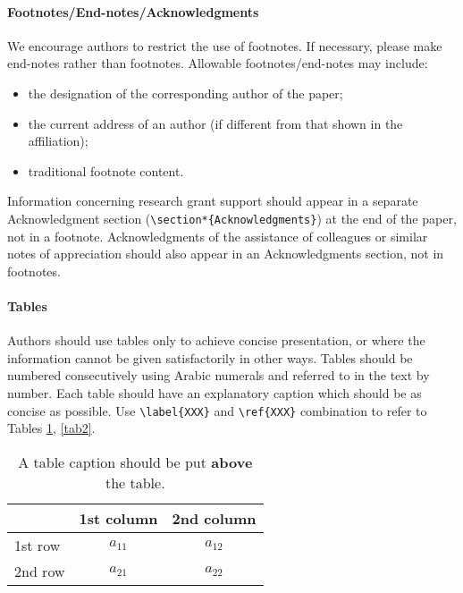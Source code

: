 \documentclass{lpaper} %
\begin{document}
\paragraph{Footnotes/End-notes/Acknowledgments}
We encourage authors to restrict the use of footnotes. If necessary, please make end-notes rather than footnotes. Allowable footnotes/end-notes may include:

\begin{itemize}
\item the designation of the corresponding author of the paper;
\item the current address of an author (if different from that shown in the affiliation);
\item traditional footnote content.
\end{itemize}


    Information concerning research grant support should appear in a separate Acknowledgment section ({\tt \verb+\section*{Acknowledgments}+}) at the end of the paper, not in a footnote. Acknowledgments of the assistance of colleagues or similar notes of appreciation should also appear in an Acknowledgments section, not in footnotes.

\paragraph{Tables}
    Authors should use tables only to achieve concise presentation, or where the information cannot be given satisfactorily in other ways. Tables should be numbered consecutively using Arabic numerals and referred to in the text by number. Each table should have an explanatory caption which should be as concise as possible. Use {\tt \verb+\label{XXX}+} and {\tt \verb+\ref{XXX}+} combination to refer to Tables \ref{tab1}, \ref{tab2}.

\begin{table}
\caption{A table caption should be put {\bfseries above} the table.\label{tab1}}
\begin{tabular}{lcc}
\hline
      & 1st column & 2nd column \\
\hline \hline
1st row & $a_{11}$ & $a_{12}$ \\
2nd row & $a_{21}$ & $a_{22}$ \\
\hline
\end{tabular}
\end{table}
\end{document}
